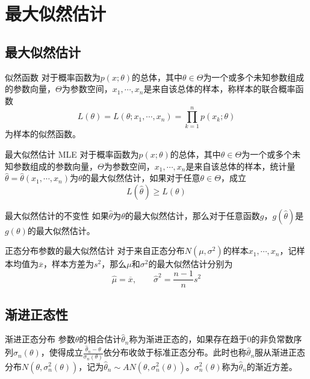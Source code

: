 \documentclass[lang = cn, scheme = chinese, thmcnt = section]{elegantbook}
\begin{document}
\section{最大似然估计}

\subsection{最大似然估计}

\begin{definition}{似然函数}
	对于概率函数为$p(x;\theta)$的总体，其中$\theta\in\Theta$为一个或多个未知参数组成的参数向量，$\Theta$为参数空间，$x_1,\cdots,x_n$是来自该总体的样本，称样本的联合概率函数
	$$
	L(\theta)=L(\theta;x_1,\cdots,x_n)=\prod_{k=1}^{n}{p(x_k;\theta)}
	$$
	为样本的似然函数。
\end{definition}

\begin{definition}{最大似然估计 MLE}
	对于概率函数为$p(x;\theta)$的总体，其中$\theta\in\Theta$为一个或多个未知参数组成的参数向量，$\Theta$为参数空间，$x_1,\cdots,x_n$是来自该总体的样本，统计量$\hat{\theta}=\hat{\theta}(x_1,\cdots,x_n)$为$\theta$的最大似然估计，如果对于任意$\theta\in\Theta$，成立
	$$
	L(\hat{\theta})\ge L(\theta)
	$$
\end{definition}

\begin{theorem}{最大似然估计的不变性}
	如果$\hat{\theta}$为$\theta$的最大似然估计，那么对于任意函数$g$，$g(\hat{\theta})$是$g(\theta)$的最大似然估计。
\end{theorem}

\begin{theorem}{正态分布参数的最大似然估计}
	对于来自正态分布$N(\mu,\sigma^2)$的样本$x_1,\cdots,x_n$，记样本均值为$\overline{x}$，样本方差为$s^2$，那么$\mu$和$\sigma^2$的最大似然估计分别为
	$$
	\hat{\mu}=\overline{x},\qquad
	\hat{\sigma}^2=\frac{n-1}{n}s^2
	$$
\end{theorem}

\subsection{渐进正态性}

\begin{definition}{渐进正态分布}
	参数$\theta$的相合估计$\hat{\theta}_n$称为渐进正态的，如果存在趋于$0$的非负常数序列$\sigma_n(\theta)$，使得成立$\frac{\hat{\theta}_n-\theta}{\sigma_n(\theta)}$依分布收敛于标准正态分布。此时也称$\hat{\theta}_n$服从渐进正态分布$N(\theta,\sigma^2_n(\theta))$，记为$\hat{\theta}_n\sim AN(\theta,\sigma^2_n(\theta))$。$\sigma^2_n(\theta)$称为$\hat{\theta}_n$的渐近方差。
\end{definition}
\end{document}
